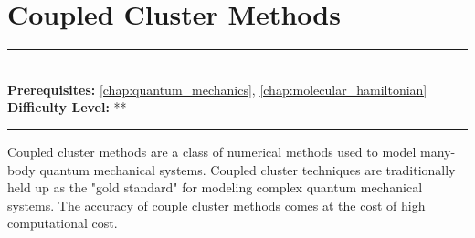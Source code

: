 \documentclass[book.tex]{subfiles}
\begin{document}
\chapter{Coupled Cluster Methods}
\label{chap:coupled_cluster}
\noindent\rule{11cm}{0.4pt} \\
\textbf{Prerequisites:} \autoref{chap:quantum_mechanics}, \autoref{chap:molecular_hamiltonian}  \\
\textbf{Difficulty Level:} ** \\
\noindent\rule{11cm}{0.4pt}
\vspace{5mm}

Coupled cluster methods are a class of numerical methods used to model many-body quantum mechanical systems. Coupled cluster techniques are traditionally held up as the "gold standard" for modeling complex quantum mechanical systems. The accuracy of couple cluster methods comes at the cost of high computational cost.
\end{document}
